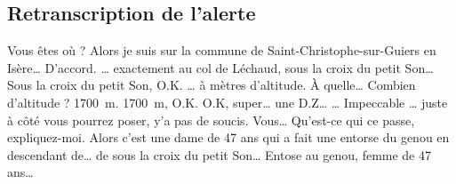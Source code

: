 \subsection{Retranscription de l'alerte}
\begin{dialogue}
 \Sec {} 
 Vous êtes où ?
 \Req Alors je suis sur la commune de Saint-Christophe-sur-Guiers en Isère…
 \Sec D'accord.
 \Req … exactement au col de Léchaud, sous la croix du petit Son…
 \Sec Sous la croix du petit Son, O.K.
 \Req … à  mètres d'altitude.
 \Sec À quelle… Combien d'altitude ?
 \Req \SI{1700}{\meter}.
 \Sec \SI{1700}{\meter}, O.K.
 \Req {}
 \Sec O.K, super…
 \Req {} une D.Z…
 \Sec … Impeccable
 \Req …  juste à côté vous pourrez poser, y'a pas de soucis.
 \Sec {} Vous… Qu'est-ce qui ce passe, expliquez-moi.
 \Req Alors c'est une dame de 47 ans qui a fait une entorse du genou en descendant de… de sous la croix du petit Son…
 \Sec Entose au genou, femme de 47 ans… 
\end{dialogue}
